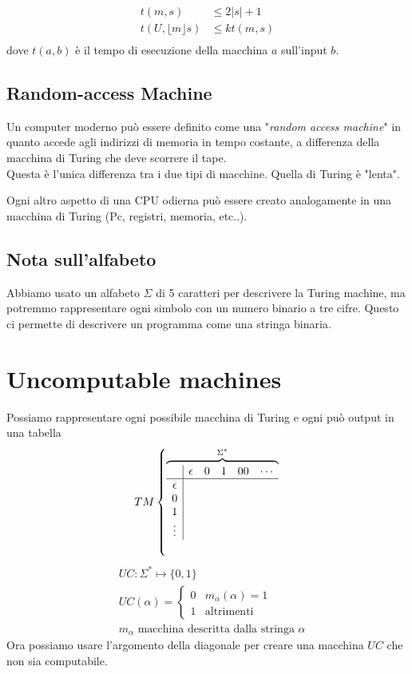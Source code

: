 \documentclass{article}
\begin{document}
\begin{align*}
    t(m,s) &\leq 2|s|+1 \\
    t(U,\lfloor m \rfloor s) &\leq k t(m,s) \\
\end{align*}
dove $t(a,b)$ è il tempo di esecuzione della macchina $a$ sull'input $b$.

\subsection{Random-access Machine}
Un computer moderno può essere definito come una "\textit{random access machine}" in quanto accede agli indirizzi di memoria in tempo costante, a differenza della macchina di Turing che deve scorrere il tape.\\
Questa è l'unica differenza tra i due tipi di macchine. Quella di Turing è "lenta".

Ogni altro aspetto di una CPU odierna può essere creato analogamente in una macchina di Turing (Pc, registri, memoria, etc..).

\subsection*{Nota sull'alfabeto}
Abbiamo usato un alfabeto $\Sigma$ di 5 caratteri per descrivere la Turing machine, ma potremmo rappresentare ogni simbolo con un numero binario a tre cifre. Questo ci permette di descrivere un programma come una stringa binaria.

\section{Uncomputable machines}
Possiamo rappresentare ogni possibile macchina di Turing e ogni può output in una tabella
\[
    TM\left\{\overbrace{\begin{array}{c|c c c c c}
            & \epsilon & 0 & 1 & 00 & \cdots \\
            \hline
        \epsilon & \\
        0   &  \\
        1 & \\
        \vdots & 

    \end{array}}^{\Sigma^*}\right.
\]
\begin{align*}
    & UC: \Sigma^*\mapsto\{0,1\} \\
    & UC(\alpha) = \begin{cases}
        0 & m_\alpha(\alpha)=1 \\
        1 & \text{altrimenti}
    \end{cases} \\
    & m_\alpha \text{ macchina descritta dalla stringa } \alpha
\end{align*}
Ora possiamo usare l'argomento della diagonale per creare una macchina $UC$ che non sia computabile.
\end{document}
